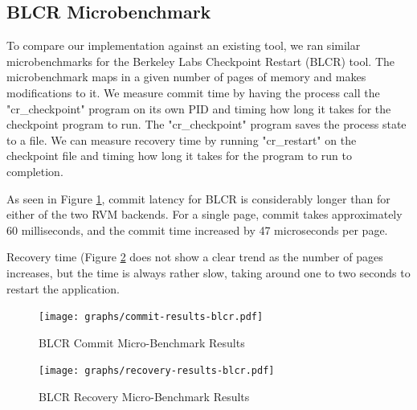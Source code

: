 \subsection{BLCR Microbenchmark}

To compare our implementation against an existing tool, we ran similar
microbenchmarks for the Berkeley Labs Checkpoint Restart (BLCR) tool.
The microbenchmark maps in a given number of pages of memory and makes
modifications to it. We measure commit time by having the process call the
"cr\_checkpoint" program on its own PID and timing how long it takes for the
checkpoint program to run. The "cr\_checkpoint" program saves the process state
to a file. We can measure recovery time by running "cr\_restart" on the
checkpoint file and timing how long it takes for the program to run to completion.

As seen in Figure \ref{fig:blcr-commit-ubm}, commit latency for BLCR is
considerably longer than for either of the two RVM backends. For a single page,
commit takes approximately 60 milliseconds, and the commit time increased by
47 microseconds per page.

Recovery time (Figure \ref{fig:blcr-recovery-ubm} does not show a clear trend
as the number of pages increases, but the time is always rather slow, taking
around one to two seconds to restart the application.

\begin{figure}[t!]
    \caption{BLCR Commit Micro-Benchmark Results}
    \texttt{[image: graphs/commit-results-blcr.pdf]}
    \label{fig:blcr-commit-ubm}
\end{figure}

\begin{figure}[t!]
    \caption{BLCR Recovery Micro-Benchmark Results}
    \texttt{[image: graphs/recovery-results-blcr.pdf]}
    \label{fig:blcr-recovery-ubm}
\end{figure}
